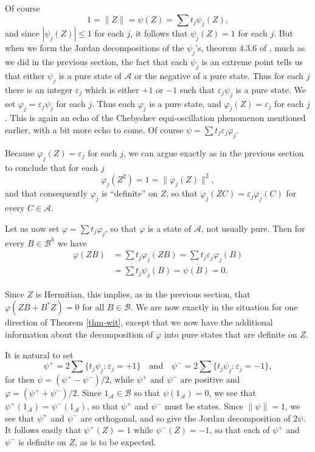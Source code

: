 \documentclass[12pt]{amsart}
\newcommand{\<}{\langle}
\renewcommand{\>}{\rangle}
\newcommand{\e}{\varepsilon}
\newcommand{\var}{\varphi}
\newcommand{\cA}{{\mathcal A}}
\newcommand{\cB}{{\mathcal B}}
\newcommand{\cBH}{{\mathcal B}^h}
\theoremstyle{definition}   %
\begin{document}
Of course
\[
1 = \|Z\| = \psi(Z) =  \sum t_j\psi_j(Z)   ,
\]
and since $|\psi_j(Z)| \leq 1$ for each $j$, 
it follows that $\psi_j(Z) = 1$ for each $j$. But when we form the Jordan decompositions of the $\psi_j$'s, theorem 4.3.6 of \cite{KR1}, much as we
did in the previous section, the fact that each $\psi_j$ is an extreme point
tells us that either $\psi_j$ is a pure state of $\cA$ or the negative of
a pure state. Thus for each $j$ there is an integer $\e_j$ which is either $+1$
or $-1$ such that $\e_j\psi_j$ is a pure state. We set $\var_j = \e_j\psi_j$
for each $j$. Thus each $\var_j$ is a pure state, and $\var_j(Z) = \e_j$
for each $j$. This is again an echo of the Chebyshev equi-oscillation 
phenomenon mentioned
earlier, with a bit more echo to come.
Of course $\psi = \sum t_j\e_j\var_j$. 

Because $\var_j(Z) = \e_j$ for each
$j$, we can argue exactly as in the previous section to conclude that
for each $j$
\[
\var_j(Z^2) = 1 = \|\var_j(Z)\|^2  ,
\]
and that consequently $\var_j$ is ``definite'' on $Z$, so that
$\var_j(ZC) = \e_j\var_j(C)$ for every $C \in \cA$.

Let us now set $\var = \sum t_j\var_j$, so that $\var$ is a state of
$\cA$, not usually pure. Then for every $B \in \cBH$ we have
\begin{align*}
\var(ZB) &= \sum t_j\var_j(ZB) = \sum t_j\e_j\var_j(B)  \\
& = \sum t_j\psi_j(B) = \psi(B) = 0  .
\end{align*}

Since $Z$ is Hermitian, this implies, as in the previous section, that
$\var(ZB + B^*Z) = 0$ for all $B \in \cB$. We are now exactly in the
situation for one direction of Theorem \ref{thm-wit}, except that we now have 
the additional information about the decomposition of $\var$ into 
pure states that are definite on $Z$.

It is natural to set 
\[
\psi^+ = 2\sum\{t_j\psi_j: \e_j = +1\} \quad \mathrm{and} \quad 
\psi^- = 2\sum\{t_j\psi_j: \e_j = -1\} ,
\]
for then $\psi = (\psi^+ - \psi^-)/2$, while $\psi^+$ and $\psi^-$
are positive and $\var = (\psi^+ + \psi^-)/2$. Since $1_\cA \in \cB$
so that $\psi(1_\cA) = 0$, we see that $\psi^+(1_\cA) = \psi^-(1_\cA)$,
so that $\psi^+$ and $\psi^-$ must be states. Since $\|\psi\| = 1$, we see
that $\psi^+$ and $\psi^-$ are orthogonal, and so give the Jordan
decomposition of 2$\psi$. It follows easily that $\psi^+(Z) = 1$
while $\psi^-(Z) = -1$, so that each of $\psi^+$ and $\psi^-$
is definite on $Z$, as is to be expected.
\end{document}
